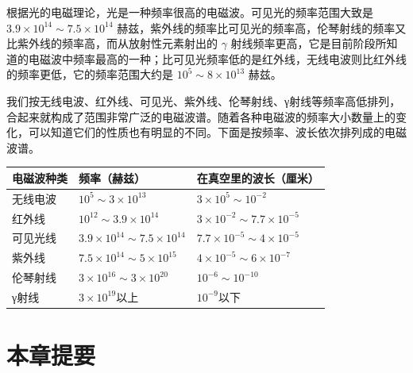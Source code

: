 根据光的电磁理论，光是一种频率很高的电磁波。可见光的频率范围大致是
\(3.9 \times 10^{14} \sim 7.5 \times 10^{14}\)
赫兹，紫外线的频率比可见光的频率高，伦琴射线的频率又比紫外线的频率高，而从放射性元素射出的
\(\gamma\)
射线频率更高，它是目前阶段所知道的电磁波中频率最高的一种；比可见光频率低的是红外线，无线电波则比红外线的频率更低，它的频率范围大约是
\(10^{5} \sim 8 \times 10^{13}\) 赫兹。

我们按无线电波、红外线、可见光、紫外线、伦琴射线、γ射线等频率高低排列，合起来就构成了范围非常广泛的电磁波谱。随着各种电磁波的频率大小数量上的变化，可以知道它们的性质也有明显的不同。下面是按频率、波长依次排列成的电磁波谱。

{\def\LTcaptype{none} %
\begin{longtable}[]{@{}
  >{\raggedright\arraybackslash}p{}
  >{\raggedright\arraybackslash}p{}
  >{\raggedright\arraybackslash}p{}@{}}
\toprule\noalign{}
\begin{minipage}[b]{\linewidth}\raggedright
电磁波种类
\end{minipage} & \begin{minipage}[b]{\linewidth}\raggedright
频率（赫兹）
\end{minipage} & \begin{minipage}[b]{\linewidth}\raggedright
在真空里的波长（厘米）
\end{minipage} \\
\midrule\noalign{}
\endhead
\bottomrule\noalign{}
\endlastfoot
无线电波 & \(10^{5} \sim 3 \times 10^{13}\) &
\(3 \times 10^{5} \sim 10^{-2}\) \\
红外线 & \(10^{12} \sim 3.9 \times 10^{14}\) &
\(3 \times 10^{-2} \sim 7.7 \times 10^{-5}\) \\
可见光线 & \(3.9\times10^{14}\sim7.5\times10^{14}\) &
\(7.7\times10^{-5}\sim4\times10^{-5}\) \\
紫外线 & \(7.5 \times 10^{14} \sim 5 \times 10^{15}\) &
\(4 \times 10^{-5} \sim 6 \times 10^{-7}\) \\
伦琴射线 & \(3 \times 10^{16} \sim 3 \times 10^{20}\) &
\(10^{-6} \sim 10^{-10}\) \\
γ射线 & \(3\times10^{19}\)以上 & \(10^{-9}\)以下 \\
\end{longtable}
}

\section{本章提要}

